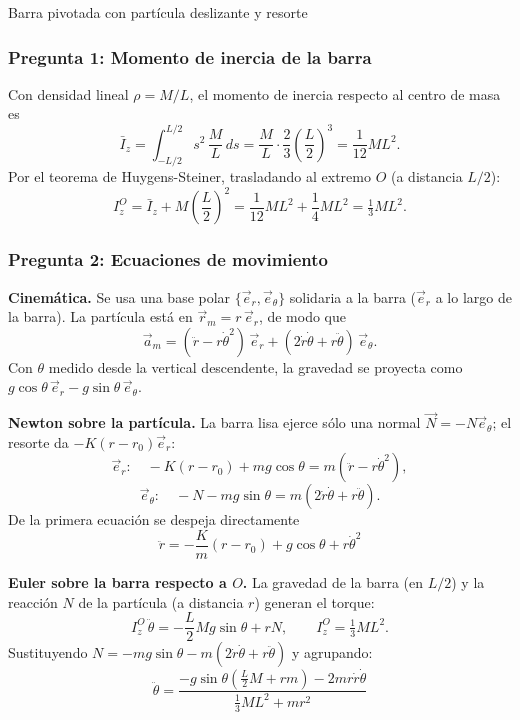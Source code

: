 \begin{solucion}{Barra pivotada con partícula deslizante y resorte}
\subsubsection*{Pregunta 1: Momento de inercia de la barra}

Con densidad lineal $\rho=M/L$, el momento de inercia respecto al centro de masa es
$$\bar{I}_z = \int_{-L/2}^{L/2} s^2\,\frac{M}{L}\,ds = \frac{M}{L}\cdot\frac{2}{3}\left(\frac{L}{2}\right)^3 = \frac{1}{12}ML^2.$$
Por el teorema de Huygens-Steiner, trasladando al extremo $O$ (a distancia $L/2$):
$$I_z^O = \bar{I}_z + M\left(\frac{L}{2}\right)^2 = \frac{1}{12}ML^2 + \frac{1}{4}ML^2 = \boxed{\tfrac13 ML^2}.$$

\subsubsection*{Pregunta 2: Ecuaciones de movimiento}

\textbf{Cinemática.} Se usa una base polar $\{\vec{e}_r,\vec{e}_\theta\}$ solidaria a la barra
($\vec{e}_r$ a lo largo de la barra). La partícula está en $\vec{r}_m=r\,\vec{e}_r$, de modo que
$$\vec{a}_m = (\ddot{r}-r\dot\theta^2)\,\vec{e}_r + (2\dot{r}\dot\theta + r\ddot\theta)\,\vec{e}_\theta.$$
Con $\theta$ medido desde la vertical descendente, la gravedad se proyecta como
$g\cos\theta\,\vec{e}_r - g\sin\theta\,\vec{e}_\theta$.

\textbf{Newton sobre la partícula.} La barra lisa ejerce sólo una normal $\vec{N}=-N\vec{e}_\theta$;
el resorte da $-K(r-r_0)\vec{e}_r$:
$$\vec{e}_r:\quad -K(r-r_0) + mg\cos\theta = m(\ddot{r}-r\dot\theta^2),$$
$$\vec{e}_\theta:\quad -N - mg\sin\theta = m(2\dot{r}\dot\theta + r\ddot\theta).$$
De la primera ecuación se despeja directamente
$$\boxed{\;\ddot{r} = -\frac{K}{m}(r-r_0) + g\cos\theta + r\dot\theta^2\;}$$

\textbf{Euler sobre la barra respecto a $O$.} La gravedad de la barra (en $L/2$) y la reacción
$N$ de la partícula (a distancia $r$) generan el torque:
$$I_z^O\,\ddot\theta = -\frac{L}{2}Mg\sin\theta + rN,\qquad I_z^O=\tfrac13 ML^2.$$
Sustituyendo $N = -mg\sin\theta - m(2\dot{r}\dot\theta + r\ddot\theta)$ y agrupando:
$$\boxed{\;\ddot\theta = \frac{-g\sin\theta\left(\tfrac{L}{2}M + rm\right) - 2mr\dot{r}\dot\theta}{\tfrac13 ML^2 + mr^2}\;}$$
\end{solucion}
